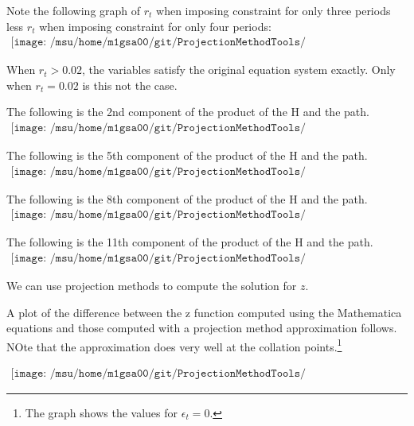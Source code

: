 \documentclass[12pt]{article}
\begin{document}
Note the following graph of $r_t$ when imposing constraint for only three periods
less $r_t$ when imposing constraint for only four periods:
\begin{gather*}
\texttt{[image: /msu/home/m1gsa00/git/ProjectionMethodTools/ProjectionMethodToolsJava/code/prettyrr03lessrr04.pdf]}
\end{gather*}


When $r_t>0.02$, the variables satisfy the original equation system exactly.
Only when $r_t=0.02$ is this not the case.


The following is the 2nd component of the product of the H and the path.
\begin{gather*}
\texttt{[image: /msu/home/m1gsa00/git/ProjectionMethodTools/ProjectionMethodToolsJava/code/prettyhapp04A.pdf]}
\end{gather*}

The following is the 5th component of the product of the H and the path.
\begin{gather*}
\texttt{[image: /msu/home/m1gsa00/git/ProjectionMethodTools/ProjectionMethodToolsJava/code/prettyhapp04B.pdf]}
\end{gather*}

The following is the 8th component of the product of the H and the path.
\begin{gather*}
\texttt{[image: /msu/home/m1gsa00/git/ProjectionMethodTools/ProjectionMethodToolsJava/code/prettyhapp04C.pdf]}
\end{gather*}


The following is the 11th component of the product of the H and the path.
\begin{gather*}
\texttt{[image: /msu/home/m1gsa00/git/ProjectionMethodTools/ProjectionMethodToolsJava/code/prettyhapp04D.pdf]}
\end{gather*}


We can use projection methods to compute the solution for $z$.

A plot of the difference between the z function computed using the Mathematica equations and those computed with a projection method approximation follows. NOte that the approximation does very well at the collation points.\footnote{The graph shows the values for $\epsilon_t=0$.}


\begin{gather*}
\texttt{[image: /msu/home/m1gsa00/git/ProjectionMethodTools/ProjectionMethodToolsJava/code/prettyNumDiff04.pdf]}
\end{gather*}
\end{document}
